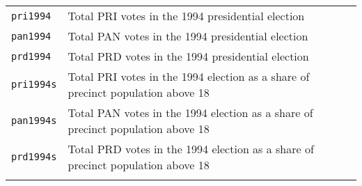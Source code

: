\documentclass[]{article}
\begin{document}
\begin{longtable}[c]{@{}ll@{}}
\begin{minipage}[t]{0.25\columnwidth}\raggedright
\texttt{pri1994}
\end{minipage} & \begin{minipage}[t]{0.68\columnwidth}\raggedright
Total PRI votes in the 1994 presidential election
\end{minipage}
\\\addlinespace
\begin{minipage}[t]{0.25\columnwidth}\raggedright
\texttt{pan1994}
\end{minipage} & \begin{minipage}[t]{0.68\columnwidth}\raggedright
Total PAN votes in the 1994 presidential election
\end{minipage}
\\\addlinespace
\begin{minipage}[t]{0.25\columnwidth}\raggedright
\texttt{prd1994}
\end{minipage} & \begin{minipage}[t]{0.68\columnwidth}\raggedright
Total PRD votes in the 1994 presidential election
\end{minipage}
\\\addlinespace
\begin{minipage}[t]{0.25\columnwidth}\raggedright
\texttt{pri1994s}
\end{minipage} & \begin{minipage}[t]{0.68\columnwidth}\raggedright
Total PRI votes in the 1994 election as a share of precinct population
above 18
\end{minipage}
\\\addlinespace
\begin{minipage}[t]{0.25\columnwidth}\raggedright
\texttt{pan1994s}
\end{minipage} & \begin{minipage}[t]{0.68\columnwidth}\raggedright
Total PAN votes in the 1994 election as a share of precinct population
above 18
\end{minipage}
\\\addlinespace
\begin{minipage}[t]{0.25\columnwidth}\raggedright
\texttt{prd1994s}
\end{minipage} & \begin{minipage}[t]{0.68\columnwidth}\raggedright
Total PRD votes in the 1994 election as a share of precinct population
above 18
\end{minipage}
\\\addlinespace
\begin{minipage}[t]{0.25\columnwidth}\raggedright

\end{minipage}
\end{longtable}
\end{document}
